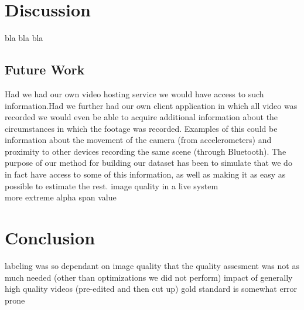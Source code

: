 \chapter{Discussion}
%
bla bla bla
%
\section{Future Work}
%
Had we had our own video hosting service we would have access to such information.Had we further had our own client application in which all video was recorded we would even be able to acquire additional information about the circumstances in which the footage was recorded. Examples of this could be information about the movement of the camera (from accelerometers) and proximity to other devices recording the same scene (through Bluetooth). The purpose of our method for building our dataset has been to simulate that we do in fact have access to some of this information, as well as making it as easy as possible to estimate the rest.
%
image quality in a live system\\
more extreme alpha span value
%
\chapter{Conclusion}
%
labeling was so dependant on image quality that the quality assesment was not as much needed (other than optimizations we did not perform)
impact of generally high quality videos (pre-edited and then cut up)
gold standard is somewhat error prone
%
